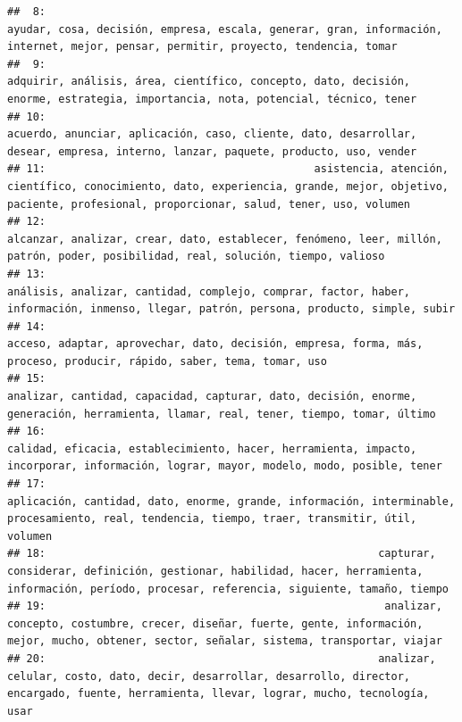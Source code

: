 \documentclass[
]{book}
\begin{document}
\begin{verbatim}
##  8:                                                                   ayudar, cosa, decisión, empresa, escala, generar, gran, información, internet, mejor, pensar, permitir, proyecto, tendencia, tomar
##  9:                                                                     adquirir, análisis, área, científico, concepto, dato, decisión, enorme, estrategia, importancia, nota, potencial, técnico, tener
## 10:                                                                    acuerdo, anunciar, aplicación, caso, cliente, dato, desarrollar, desear, empresa, interno, lanzar, paquete, producto, uso, vender
## 11:                                          asistencia, atención, científico, conocimiento, dato, experiencia, grande, mejor, objetivo, paciente, profesional, proporcionar, salud, tener, uso, volumen
## 12:                                                                     alcanzar, analizar, crear, dato, establecer, fenómeno, leer, millón, patrón, poder, posibilidad, real, solución, tiempo, valioso
## 13:                                                               análisis, analizar, cantidad, complejo, comprar, factor, haber, información, inmenso, llegar, patrón, persona, producto, simple, subir
## 14:                                                                                 acceso, adaptar, aprovechar, dato, decisión, empresa, forma, más, proceso, producir, rápido, saber, tema, tomar, uso
## 15:                                                                 analizar, cantidad, capacidad, capturar, dato, decisión, enorme, generación, herramienta, llamar, real, tener, tiempo, tomar, último
## 16:                                                                calidad, eficacia, establecimiento, hacer, herramienta, impacto, incorporar, información, lograr, mayor, modelo, modo, posible, tener
## 17:                                                      aplicación, cantidad, dato, enorme, grande, información, interminable, procesamiento, real, tendencia, tiempo, traer, transmitir, útil, volumen
## 18:                                                    capturar, considerar, definición, gestionar, habilidad, hacer, herramienta, información, período, procesar, referencia, siguiente, tamaño, tiempo
## 19:                                                     analizar, concepto, costumbre, crecer, diseñar, fuerte, gente, información, mejor, mucho, obtener, sector, señalar, sistema, transportar, viajar
## 20:                                                    analizar, celular, costo, dato, decir, desarrollar, desarrollo, director, encargado, fuente, herramienta, llevar, lograr, mucho, tecnología, usar

\end{verbatim}
\end{document}
